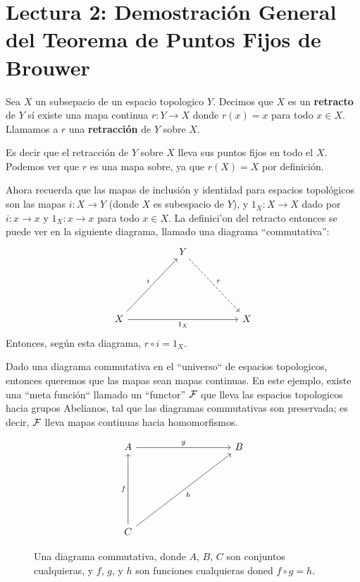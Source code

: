 \section*{Lectura 2: Demostraci\'on General del Teorema de Puntos Fijos de
Brouwer}

\begin{definition}
    Sea $X$ un subsepacio de un espacio topologico  $Y$. Decimos que  $X$ es un
     \textbf{retracto} de $Y$ s\'i existe una mapa continua $r:Y \rightarrow X$
     donde $r(x)=x$ para todo $x \in X$. Llamamos a $r$ una
     \textbf{retracci\'on} de $Y$ sobre  $X$.
\end{definition}

Es decir que el retracci\'on de $Y$ sobre $X$  lleva sus puntos fijos en todo el
$X$. Podemos ver que  $r$ es una mapa sobre, ya que $r(X)=X$ por definici\'on.

Ahora recuerda que las mapas de inclusi\'on y identidad para espacios
topol\'ogicos son las mapas $i:X \rightarrow Y$ (donde $X$ es subespacio de
$Y$), y $1_X:X \rightarrow X$ dado por $i:x \rightarrow x$ y $1_X:x \rightarrow
x$ para todo $x \in X$. La definici'on del retracto entonces se puede ver en la
siguiente diagrama, llamado una diagrama ``commutativa'':
\[\begin{tikzcd}
	&& Y \\
	\\
	\\
	X &&&& X
	\arrow["i", from=4-1, to=1-3]
	\arrow["{1_X}"', from=4-1, to=4-5]
	\arrow["r", dashed, from=1-3, to=4-5]
\end{tikzcd}\]
Entonces, seg\'un esta diagrama, $r \circ i=1_X$.

Dado una diagrama commutativa en el ``universo`` de espacios topologicos,
entonces queremos que las mapas sean mapas continuas. En este ejemplo, existe
una ``meta funci\'on`` llamado un ``functor'' $\mathcal{F}$ que lleva las espacios
topologicos hacia grupos Abelianos, tal que las diagramas commutativas son
preservada; es decir,  $\mathcal{F}$ lleva mapas continuas hacia homomorfismos.

 \begin{figure}[h]
    \centering
\[\begin{tikzcd}
	A &&&& B \\
	\\
	\\
	\\
	C
	\arrow["f", from=5-1, to=1-1]
	\arrow["g", from=1-1, to=1-5]
	\arrow["h"', from=5-1, to=1-5]
\end{tikzcd}\]
    \caption{Una diagrama commutativa, donde $A$, $B$,  $C$ son conjuntos
    cualquieras, y $f$,  $g$, y  $h$ son funciones cualquieras doned  $f \circ
g=h$.}
    \label{fig_3}
\end{figure}

